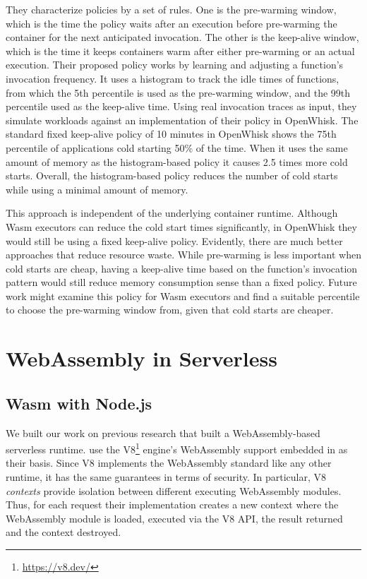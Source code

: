 They characterize policies by a set of rules. One is the pre-warming window, which is the time the policy waits after an execution before pre-warming the container for the next anticipated invocation. The other is the keep-alive window, which is the time it keeps containers warm after either pre-warming or an actual execution.
Their proposed policy works by learning and adjusting a function's invocation frequency. It uses a histogram to track the idle times of functions, from which the 5th percentile is used as the pre-warming window, and the 99th percentile used as the keep-alive time.
Using real invocation traces as input, they simulate workloads against an implementation of their policy in OpenWhisk. The standard fixed keep-alive policy of 10 minutes in OpenWhisk shows the 75th percentile of applications cold starting 50\% of the time. When it uses the same amount of memory as the histogram-based policy it causes 2.5 times more cold starts. Overall, the histogram-based policy reduces the number of cold starts while using a minimal amount of memory.

This approach is independent of the underlying container runtime. Although Wasm executors can reduce the cold start times significantly, in OpenWhisk they would still be using a fixed keep-alive policy. Evidently, there are much better approaches that reduce resource waste. While pre-warming is less important when cold starts are cheap, having a keep-alive time based on the function's invocation pattern would still reduce memory consumption sense than a fixed policy. Future work might examine this policy for Wasm executors and find a suitable percentile to choose the pre-warming window from, given that cold starts are cheaper.

\section{WebAssembly in Serverless}

\subsection{Wasm with Node.js}

We built our work on previous research that built a WebAssembly-based serverless runtime. \citeauthor{Hall2019} use the V8\footnote{\url{https://v8.dev/}} engine's WebAssembly support embedded in  as their basis.
Since V8 implements the WebAssembly standard like any other runtime, it has the same guarantees in terms of security. In particular, V8 \emph{contexts} provide isolation between different executing WebAssembly modules. Thus, for each request their implementation creates a new context where the WebAssembly module is loaded, executed via the V8 API, the result returned and the context destroyed.

